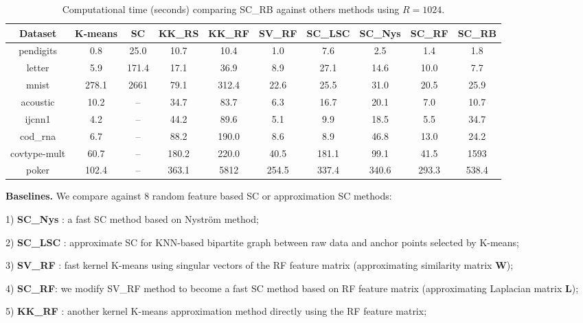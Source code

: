 \documentclass[sigconf]{acmart}
\newcommand{\1}{\boldsymbol{1}}
\newcommand{\bW}{\mathbf{W}}
\newcommand{\bL}{\mathbf{L}}
\newcommand{\0}{\boldsymbol{0}}
\begin{document}
\begin{table*}[t]
\centering
\caption{Computational time (seconds) comparing SC\_RB against others methods using $R=1024$.}
\vspace{0mm}
\label{tb:runtime_alldata}
\newcommand{\Bd}[1]{\textbf{#1}}
\begin{center}
    \begin{tabular}{ c c c c c c c c c c}
    \hline
    Dataset & K-means & SC & KK\_RS & KK\_RF & SV\_RF & SC\_LSC & SC\_Nys & SC\_RF & SC\_RB \\ \hline 
    pendigits  & 0.8 & 25.0 & 10.7 & 10.4 & 1.0 & 7.6 & 2.5 & 1.4 & 1.8 \\ 
    letter	 & 5.9 & 171.4 & 17.1 & 36.9 & 8.9 & 27.1 & 14.6 & 10.0 & 7.7 \\ 
    mnist	& 278.1 & 2661 & 79.1 & 312.4 & 22.6 & 25.5 & 31.0 & 20.5 & 25.9 \\ 
    acoustic  & 10.2 & -- & 34.7 & 83.7 & 6.3 & 16.7  & 20.1 & 7.0 & 10.7 \\ 
    ijcnn1  & 4.2 & -- & 44.2 & 89.6 & 5.1 & 9.9  & 18.5 & 5.5 & 34.7 \\ 
    cod\_rna  & 6.7 & -- & 88.2 & 190.0 & 8.6 & 8.9 & 46.8 & 13.0 & 24.2 \\ 
    covtype-mult  & 60.7 & -- & 180.2 & 220.0 & 40.5 & 181.1 & 99.1 & 41.5 & 1593 \\ 
    poker  & 102.4 & -- & 363.1 & 5812 & 254.5 & 337.4 & 340.6 & 293.3 & 538.4  \\ \hline
    \end{tabular}
\end{center}
\end{table*}


\textbf{Baselines.} We compare against 8 random feature based SC or approximation SC methods:

1) \textbf{SC\_Nys} \cite{fowlkes2004spectral}: a fast SC method based on Nystr{\"o}m method; 

2) \textbf{SC\_LSC} \cite{chen2011large}: approximate SC for KNN-based bipartite graph between raw data and anchor points selected by K-means;

3) \textbf{SV\_RF} \cite{chitta2012efficient}: fast kernel K-means using singular vectors of the RF feature matrix (approximating similarity matrix $\bW$); 

4) \textbf{SC\_RF}: we modify SV\_RF method to become a fast SC method based on RF feature matrix (approximating Laplacian matrix $\bL$); 

5) \textbf{KK\_RF} \cite{chitta2012efficient}: another kernel K-means approximation method directly using the RF feature matrix; 
\end{document}
